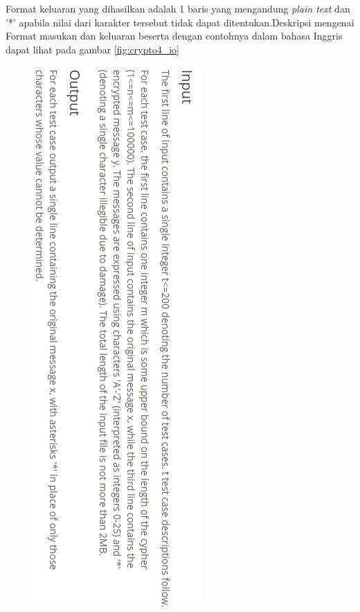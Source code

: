 	
	Format keluaran yang dihasilkan adalah 1 baris yang mengandung \textit{plain text} dan '*' apabila nilai dari karakter tersebut tidak dapat ditentukan.Deskripsi mengenai Format masukan dan keluaran beserta dengan contohnya dalam bahasa Inggris dapat lihat pada gambar \ref{fig:crypto4_io}
	\begin{figure}[H]
		\centering
		\includegraphics[scale=0.7]{images/bab2/crypto_io1.png}
	\end{figure}
